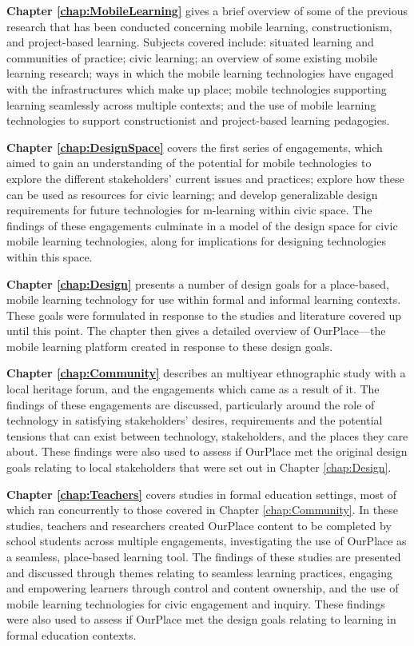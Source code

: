\textbf{Chapter \ref{chap:MobileLearning}} gives a brief overview of some of the previous research that has been conducted concerning mobile learning, constructionism, and project-based learning. Subjects covered include: situated learning and communities of practice; civic learning; an overview of some existing mobile learning research; ways in which the mobile learning technologies have engaged with the infrastructures which make up place; mobile technologies supporting learning seamlessly across multiple contexts; and the use of mobile learning technologies to support constructionist and project-based learning pedagogies.

\textbf{Chapter \ref{chap:DesignSpace}} covers the first series of engagements, which aimed to gain an understanding of the potential for mobile technologies to explore the different stakeholders’ current issues and practices; explore how these can be used as resources for civic learning; and develop generalizable design requirements for future technologies for m-learning within civic space. The findings of these engagements culminate in a model of the design space for civic mobile learning technologies, along for implications for designing technologies within this space.

\textbf{Chapter \ref{chap:Design}} presents a number of design goals for a place-based, mobile learning technology for use within formal and informal learning contexts. These goals were formulated in response to the studies and literature covered up until this point. The chapter then gives a detailed overview of OurPlace---the mobile learning platform created in response to these design goals.

\textbf{Chapter \ref{chap:Community}} describes an multiyear ethnographic study with a local heritage forum, and the engagements which came as a result of it. The findings of these engagements are discussed, particularly around the role of technology in satisfying stakeholders' desires, requirements and the potential tensions that can exist between technology, stakeholders, and the places they care about. These findings were also used to assess if OurPlace met the original design goals relating to local stakeholders that were set out in Chapter \ref{chap:Design}.

\textbf{Chapter \ref{chap:Teachers}} covers studies in formal education settings, most of which ran concurrently to those covered in Chapter \ref{chap:Community}. In these studies, teachers and researchers created OurPlace content to be completed by school students across multiple engagements, investigating the use of OurPlace as a seamless, place-based learning tool. The findings of these studies are presented and discussed through themes relating to seamless learning practices, engaging and empowering learners through control and content ownership, and the use of mobile learning technologies for civic engagement and inquiry. These findings were also used to assess if OurPlace met the design goals relating to learning in formal education contexts.

